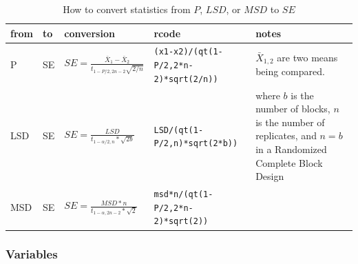 \documentclass[12pt,english,portrait]{article}
\begin{document}
\begin{table}
  \caption{How to convert statistics from $P$, $LSD$, or $MSD$ to $SE$}
  \label{tab:statconversions}
  \begin{tabular}{llllp{2in}}
    \hline
    from & to & conversion                      & rcode & notes\\ \hline
    P   & SE & $SE = \frac{\bar{X}_1-\bar{X}_2}{t_{1-P/2,2n-2}\sqrt{2/n}}$ &\verb+(x1-x2)/(qt(1-P/2,2*n-2)*sqrt(2/n))+& $\bar{X}_{1,2}$ are two means being compared.      \\
    LSD & SE & $SE = \frac{LSD}{t_{1-\alpha/2,n}*\sqrt{2b}}$ &\verb+LSD/(qt(1-P/2,n)*sqrt(2*b))+ &where $b$ is the number of blocks, $n$ is the number of replicates, and  $n=b$ in a Randomized Complete Block Design \\
    MSD & SE & $SE = \frac{MSD*n}{t_{1-\alpha, 2n-2}*\sqrt{2}}$ & \verb+msd*n/(qt(1-P/2,2*n-2)*sqrt(2))+ \\
    \hline
  \end{tabular}
\end{table}

\subsubsection{Variables}
 
\end{document}
